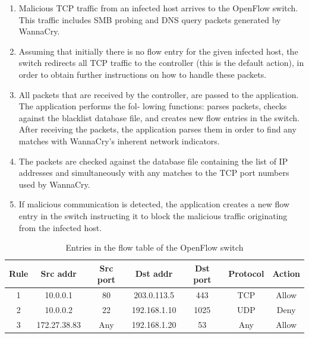 \documentclass[12pt,letterpaper]{article}
\begin{document}
            \begin{enumerate}
                \item Malicious \ac{TCP} traffic from an infected host arrives to the OpenFlow switch. This traffic includes \ac{SMB} probing and DNS query packets generated by WannaCry.

                \item Assuming that initially there is no flow entry for the given infected host, the switch redirects all TCP traffic to the controller (this is the default action), in order to obtain further instructions on how to handle these packets.

                \item All packets that are received by the controller, are passed to the application. The application performs the fol- lowing functions: parses packets, checks against the blacklist database file, and creates new flow entries in the switch. After receiving the packets, the application parses them in order to find any matches with WannaCry’s inherent network indicators.

                \item The packets are checked against the database file containing the list of IP addresses and simultaneously with any matches to the TCP port numbers used by WannaCry.

                \item If malicious communication is detected, the application creates a new flow entry in the switch instructing it to block the malicious traffic originating from the infected host.
               
            \end{enumerate}


            \begin{table}[ht]
                \centering
                \caption{Entries in the flow table of the OpenFlow switch}
                \label{tab:firewall-rules}
                    \begin{tabular}{ccccccc}
                        \toprule
                \textbf{Rule} & \textbf{Src addr} & \textbf{Src port} & \textbf{Dst addr} & \textbf{Dst port} & \textbf{Protocol} & \textbf{Action} \\
                \midrule
        1 & 10.0.0.1 & 80 & 203.0.113.5 & 443 & TCP & Allow \\
        2 & 10.0.0.2 & 22 & 192.168.1.10 & 1025 & UDP & Deny \\
        3 & 172.27.38.83 & Any & 192.168.1.20 & 53 & Any & Allow \\
                \bottomrule
                \end{tabular}
            \end{table}
\end{document}
